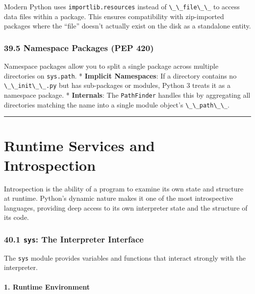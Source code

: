 Modern Python uses \passthrough{\lstinline!importlib.resources!} instead
of \passthrough{\lstinline!\_\_file\_\_!} to access data files within a
package. This ensures compatibility with zip-imported packages where the
``file'' doesn't actually exist on the disk as a standalone entity.

\hypertarget{namespace-packages-pep-420}{%
\subsection{39.5 Namespace Packages (PEP
420)}\label{namespace-packages-pep-420}}

Namespace packages allow you to split a single package across multiple
directories on \passthrough{\lstinline!sys.path!}. * \textbf{Implicit
Namespaces}: If a directory contains no
\passthrough{\lstinline!\_\_init\_\_.py!} but has sub-packages or
modules, Python 3 treats it as a namespace package. *
\textbf{Internals}: The \passthrough{\lstinline!PathFinder!} handles
this by aggregating all directories matching the name into a single
module object's \passthrough{\lstinline!\_\_path\_\_!}.

\begin{center}\rule{0.5\linewidth}{0.5pt}\end{center}

\hypertarget{runtime-services-and-introspection}{%
\chapter{Runtime Services and
Introspection}\label{runtime-services-and-introspection}}

Introspection is the ability of a program to examine its own state and
structure at runtime. Python's dynamic nature makes it one of the most
introspective languages, providing deep access to its own interpreter
state and the structure of its code.

\hypertarget{sys-the-interpreter-interface}{%
\subsection{\texorpdfstring{40.1 \texttt{sys}: The Interpreter
Interface}{40.1 sys: The Interpreter Interface}}\label{sys-the-interpreter-interface}}

The \passthrough{\lstinline!sys!} module provides variables and
functions that interact strongly with the interpreter.

\hypertarget{runtime-environment}{%
\subsubsection{1. Runtime Environment}\label{runtime-environment}}


